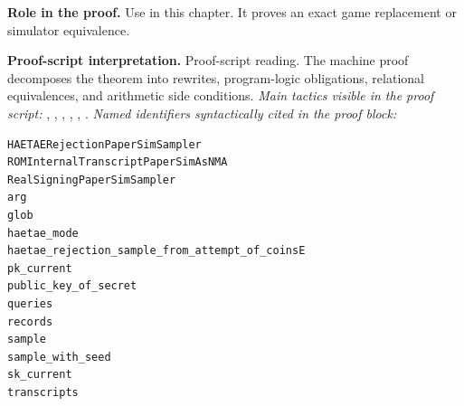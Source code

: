 \begin{formaltheorem}
\noindent\textbf{Role in the proof.}
Use in this chapter. It proves an exact game replacement or simulator equivalence.

\noindent\textbf{Proof-script interpretation.}
Proof-script reading. The machine proof decomposes the theorem into rewrites, program-logic obligations, relational equivalences, and arithmetic side conditions.
\emph{Main tactics visible in the proof script:} , , , , , .
\emph{Named identifiers syntactically cited in the proof block:}
\begin{lstlisting}[language=EasyCrypt,basicstyle=\ttfamily\scriptsize]
HAETAERejectionPaperSimSampler
ROMInternalTranscriptPaperSimAsNMA
RealSigningPaperSimSampler
arg
glob
haetae_mode
haetae_rejection_sample_from_attempt_of_coinsE
pk_current
public_key_of_secret
queries
records
sample
sample_with_seed
sk_current
transcripts
\end{lstlisting}

\end{formaltheorem}

